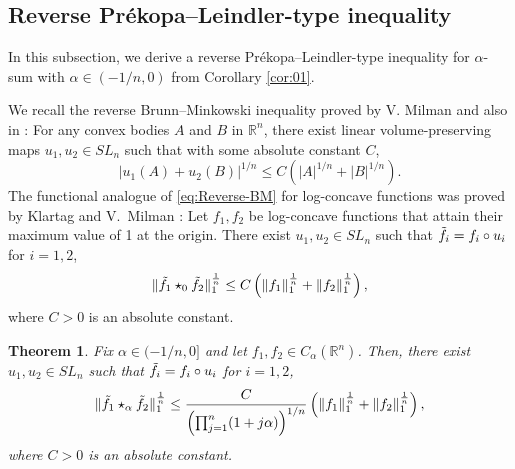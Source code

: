 \documentclass[11pt]{amsart}
\newcommand{\R}{{\mathbb R}}
\theoremstyle{plain}
\newtheorem{theorem}{Theorem}[section]
\theoremstyle{definition}
\theoremstyle{remark}
\begin{document}
\subsection{Reverse Pr\'ekopa--Leindler-type inequality}
In this subsection, we derive a reverse Pr\'ekopa--Leindler-type inequality for $\alpha$-sum with $\alpha \in (-1/n,0)$ from Corollary \ref{cor:01}.

We recall the reverse Brunn--Minkowski inequality proved by V. Milman \cite{VM-86,VM-86/87,VM-88} and also in \cite{BM-12}: For any convex bodies $A$ and $B$ in $\mathbb{R}^n$, there exist linear volume-preserving maps $u_1,u_2 \in SL_n$ such that with some absolute constant $C$,
\begin{equation}
    \label{eq:Reverse-BM}
    |u_1(A)+u_2(B)|^{1 / n} \leq C\left(|A|^{1 / n}+|B|^{1 / n}\right).
\end{equation}
The functional analogue of \eqref{eq:Reverse-BM} for log-concave functions was proved by Klartag and V.~Milman \cite[Theorem 1.3]{KM-05}: Let $f_1,f_2$ be log-concave functions that attain their maximum value of 1 at the origin. There exist  $u_1,u_2 \in SL_n$ such that $\Tilde{{f}_i} = f_i \circ u_i $ for $i =1,2$,
\begin{equation}
    \label{eq: reverse-PL_0}
    \|\Tilde{{f}_1} \star_0 \Tilde{{f}_2}\|_1^{\frac{1}{n}}\leq C \left(\| {f}_1\|_1^{\frac{1}{n}}+\| {f}_2\|_1^{\frac{1}{n}}\right),
    \end{equation}
    where $C>0$ is an absolute constant.


\begin{theorem}
    \label{thm: reverse-PL_alpha}
    Fix $\alpha \in (-1/n,0] $ and let $f_1,f_2 \in C_\alpha (\R^n)$. Then, there exist $u_1,u_2 \in SL_n$ such that $\Tilde{f}_i = f_i \circ u_i $ for $i =1,2$,
    \begin{equation}
    \label{eq: reverse-PL_alpha}
        \|\Tilde{{f}_1} \star_\alpha \Tilde{{f}_2}\|_1^{\frac{1}{n}}
        \leq
        \frac{C}{\left(\prod_{j=1}^n(1+j \alpha)\right)^{1/n}}\left(\| {f}_1\|_1^{\frac{1}{n}}+\| {f}_2\|_1^{\frac{1}{n}}\right),
    \end{equation}
    where $C>0$ is an absolute constant.
\end{theorem}
\end{document}
